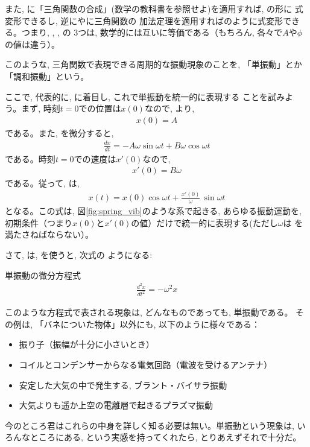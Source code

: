 また, 
に「三角関数の合成」(数学の教科書を参照せよ)を適用すれば, の形に
式変形できるし, 逆にやに三角関数の
加法定理を適用すればのように式変形できる。つまり, 
, , の
3つは, 数学的には互いに等価である（もちろん, 各々で$A$や$\phi$の値は違う）。

このような, 三角関数で表現できる周期的な振動現象のことを, 「単振動」とか「調和振動」という。

ここで, 代表的に, に着目し, これで単振動を統一的に表現する
ことを試みよう。まず, 時刻$t=0$での位置は$x(0)$なので, より, 
\begin{eqnarray}
x(0)=A
\end{eqnarray}
である。また, を微分すると, 
\begin{eqnarray}
\frac{dx}{dt}=-A\omega\sin\omega t+B\omega\cos\omega t
\end{eqnarray}
である。時刻$t=0$での速度は$x'(0)$なので, 
\begin{eqnarray}
x'(0)=B\omega
\end{eqnarray}
である。従って, は, 
\begin{eqnarray}
x(t)=x(0)\cos\omega t+\frac{x'(0)}{\omega}\,\sin\omega t\label{eq:lincombvib3}
\end{eqnarray}
となる。この式は, 図\ref{fig:spring_vib}のような系で起きる, あらゆる振動運動を, 
初期条件（つまり$x(0)$と$x'(0)$の値）だけで統一的に表現する(ただし$\omega$は
を満たさねばならない）。\mv

さて, は, を使うと, 次式の
ようになる:
\begin{itembox}{単振動の微分方程式}
\begin{eqnarray}
\frac{d^2x}{dt^2}=-\omega^2x\label{eq:vib}
\end{eqnarray}
\end{itembox}
このような方程式で表される現象は, どんなものであっても, 単振動である。
その例は, 「バネについた物体」以外にも, 以下のように様々である：
\begin{itemize}
\item 振り子（振幅が十分に小さいとき）
\item コイルとコンデンサーからなる電気回路（電波を受けるアンテナ）
\item 安定した大気の中で発生する, ブラント・バイサラ振動
\item 大気よりも遥か上空の電離層で起きるプラズマ振動
\end{itemize}
今のところ君はこれらの中身を詳しく知る必要は無い。単振動という現象は, 
いろんなところにある, という実感を持ってくれたら, とりあえずそれで十分だ。

